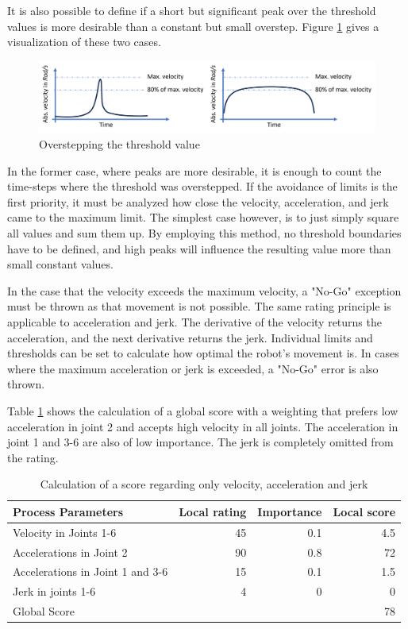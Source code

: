 It is also possible to define if a short but significant peak over the threshold values is more desirable than a constant but small overstep. Figure \ref{peaklong} gives a visualization of these two cases.

\begin{figure}[H]
	\centerline{\includegraphics[width=1\textwidth]{figures/peaklong.png}}
	\caption{Overstepping the threshold value}
	\label{peaklong}
\end{figure}

In the former case, where peaks are more desirable, it is enough to count the time-steps where the threshold was overstepped. If the avoidance of limits is the first priority, it must be analyzed how close the velocity, acceleration, and jerk came to the maximum limit. The simplest case however, is to just simply square all values and sum them up. By employing this method, no threshold boundaries have to be defined, and high peaks will influence the resulting value more than small constant values.

In the case that the velocity exceeds the maximum velocity, a "No-Go" exception must be thrown as that movement is not possible. The same rating principle is applicable to acceleration and jerk. The derivative of the velocity returns the acceleration, and the next derivative returns the jerk. Individual limits and thresholds can be set to calculate how optimal the robot's movement is. In cases where the maximum acceleration or jerk is exceeded, a "No-Go" error is also thrown.


Table \ref{VAJ} shows the calculation of a global score with a weighting that prefers low acceleration in joint 2 and accepts high velocity in all joints. The acceleration in joint 1 and 3-6 are also of low importance. The jerk is completely omitted from the rating.


\begin{table}[H]
	\centering
	\begin{tabular}{||l|r|r|r||}
		Process Parameters & Local rating & Importance & Local score\\
		\hline
		\hline
		\hline
		Velocity in Joints 1-6& 45& 0.1&4.5\\
		Accelerations in Joint 2& 90 & 0.8 & 72\\
		Accelerations in Joint 1 and 3-6 & 15& 0.1&1.5\\
		Jerk in joints 1-6& 4& 0&0\\
		
		\hline
		\hline
		\hline
		Global Score& & &78\\
		\hline
		\hline
	\end{tabular}
	
	\caption{Calculation of a score regarding only velocity, acceleration and jerk}
	\label{VAJ}
\end{table}


